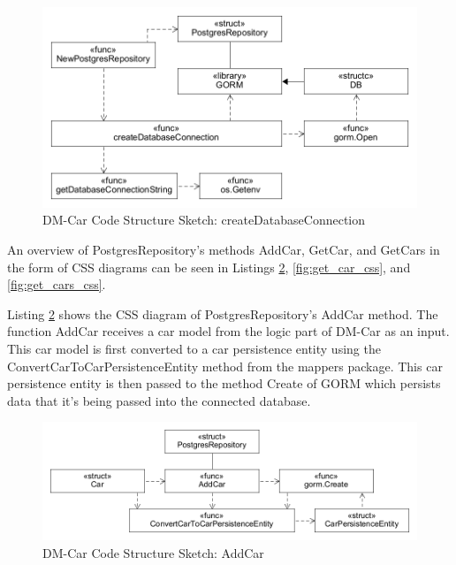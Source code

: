 \begin{figure}[tb]
	\centering
	\includegraphics[width=\textwidth]{figures/CreateDatabaseConnectionCSS.png}
	\caption{DM-Car Code Structure Sketch: createDatabaseConnection}
	\label{fig:create_db_connection_css}
\end{figure}

An overview of PostgresRepository's methods AddCar, GetCar, and GetCars in the form of CSS diagrams
can be seen in Listings \ref{fig:add_car_css}, \ref{fig:get_car_css}, and \ref{fig:get_cars_css}.

Listing \ref{fig:add_car_css} shows the CSS diagram of PostgresRepository's AddCar method.
The function AddCar receives a car model from the logic part of DM-Car as an input.
This car model is first converted to a car persistence entity using the ConvertCarToCarPersistenceEntity
method from the mappers package.
This car persistence entity is then passed to the method Create of GORM which persists data that it's being passed
into the connected database.

\begin{figure}[tb]
	\centering
	\includegraphics[width=\textwidth]{figures/AddCarCSS.png}
	\caption{DM-Car Code Structure Sketch: AddCar}
	\label{fig:add_car_css}
\end{figure}


